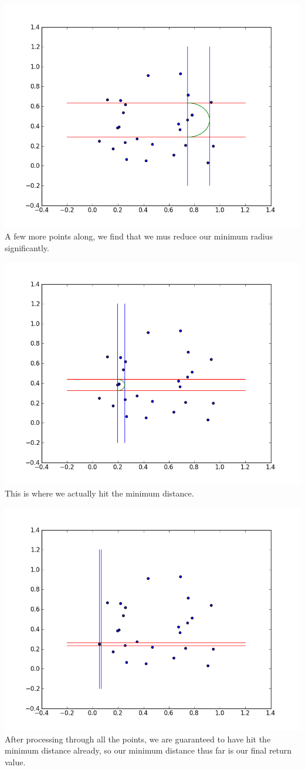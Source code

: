 \includegraphics[width = \textwidth]{ptsweep4.png}
A few more points along, we find that we mus reduce our minimum radius significantly.

\includegraphics[width = \textwidth]{ptsweep20.png}
This is where we actually hit the minimum distance.

\includegraphics[width = \textwidth]{ptsweep23.png}
After processing through all the points, we are guaranteed to have hit the minimum distance already, so our minimum distance thus far is our final return value.

